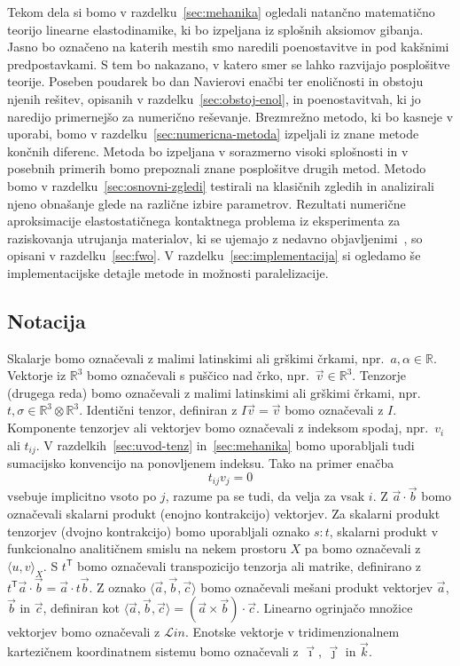 \documentclass[12pt,a4paper,twoside]{article}
\theoremstyle{definition} %
\theoremstyle{plain} %
\numberwithin{equation}{section}
\newcommand{\R}{\mathbb R}
\newcommand{\T}{\mathsf{T}}
\newcommand{\Lin}{\mathcal{L}in}
\newcommand{\vv}{\vec{v}}
\newcommand{\va}{\vec{a}}
\newcommand{\vc}{\vec{c}}
\newcommand{\vb}{\vec{b}}
\newcommand{\vi}{\vec{\imath}}
\newcommand{\vj}{\vec{\jmath}}
\newcommand{\vk}{\vec{k}}
\begin{document}
Tekom dela si bomo v razdelku~\ref{sec:mehanika} ogledali natančno matematično teorijo linearne
elastodinamike, ki bo izpeljana iz splošnih aksiomov gibanja. Jasno bo označeno na katerih mestih smo
naredili poenostavitve in pod kakšnimi predpostavkami. S tem bo nakazano, v katero smer se lahko
razvijajo posplošitve teorije. Poseben poudarek bo dan Navierovi enačbi ter enoličnosti in obstoju
njenih rešitev, opisanih v razdelku~\ref{sec:obstoj-enol}, in poenostavitvah, ki jo naredijo
primernejšo za numerično reševanje. Brezmrežno metodo, ki bo kasneje v uporabi, bomo v
razdelku~\ref{sec:numericna-metoda} izpeljali iz znane metode končnih diferenc. Metoda bo izpeljana
v sorazmerno visoki splošnosti in v posebnih primerih bomo prepoznali znane posplošitve drugih
metod. Metodo bomo v razdelku~\ref{sec:osnovni-zgledi} testirali na klasičnih zgledih in analizirali
njeno obnašanje glede na različne izbire parametrov. Rezultati numerične aproksimacije
elastostatičnega kontaktnega problema iz eksperimenta za raziskovanja utrujanja materialov, ki se
ujemajo z nedavno objavljenimi~\cite{pereira2016convergence}, so opisani v razdelku~\ref{sec:fwo}. V
razdelku~\ref{sec:implementacija} si ogledamo še implementacijske detajle metode in možnosti
paralelizacije.

\subsection{Notacija}
Skalarje bomo označevali z malimi latinskimi ali grškimi črkami, npr.~$a, \alpha
\in \R$. Vektorje iz $\R^3$ bomo označevali s puščico nad črko, npr.~$\vv \in
\R^3$. Tenzorje (drugega reda) bomo označevali z malimi latinskimi ali grškimi
črkami, npr.~$t, \sigma \in \R^3\otimes\R^3$. Identični tenzor, definiran z $I\vv = \vv$ bomo
označevali z $I$. Komponente tenzorjev ali vektorjev bomo označevali z indeksom spodaj, npr.~$v_i$
ali $t_{ij}$. V razdelkih~\ref{sec:uvod-tenz} in~\ref{sec:mehanika} bomo uporabljali tudi
sumacijsko konvencijo na ponovljenem indeksu. Tako na primer enačba
\[
  t_{ij}v_j = 0
\]
vsebuje implicitno vsoto po $j$, razume pa se tudi, da velja za vsak $i$. Z $\va\cdot\vb$ bomo
označevali skalarni produkt (enojno kontrakcijo) vektorjev. Za skalarni produkt tenzorjev (dvojno
kontrakcijo) bomo uporabljali oznako $s:t$, skalarni produkt v funkcionalno analitičnem smislu na
nekem prostoru $X$ pa bomo označevali z $\langle u, v\rangle_X$. S $t^\T$ bomo označevali
transpozicijo tenzorja ali matrike, definirano z $t^\T\va \cdot \vb = \va\cdot t\vb$. Z oznako
$\langle \va, \vb, \vc\rangle$ bomo označevali mešani produkt vektorjev $\va$, $\vb$ in $\vc$,
definiran kot $\langle \va, \vb, \vc\rangle = (\va\times\vb)\cdot \vc$.
Linearno ogrinjačo množice vektorjev bomo označevali z $\Lin$. Enotske vektorje v tridimenzionalnem
kartezičnem koordinatnem sistemu bomo označevali z $\vi$, $\vj$ in $\vk$.
\end{document}
